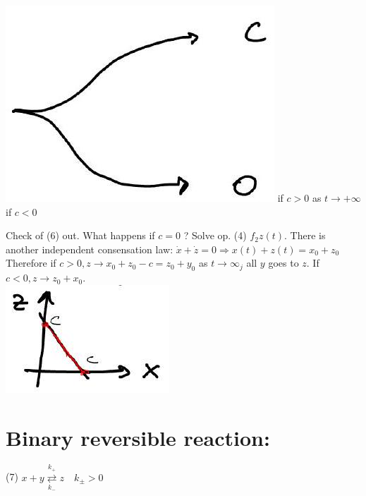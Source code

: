 \documentclass[10pt]{article}
\begin{document}
\includegraphics[max width=\textwidth]{2025_10_17_109d3ce1ba98c27731a1g-3(1)} if $c>0$ as $t \rightarrow+\infty$\\
if $c<0$

Check of (6) out. What happens if $c=0$ ? Solve op. (4) $f_{2} z(t)$. There is another independent consensation law: $\dot{x}+\dot{z}=0 \Rightarrow x(t)+z(t)=x_{0}+z_{0}$ Therefore if $c>0, z \longrightarrow x_{0}+z_{0}-c=z_{0}+y_{0}$ as $t \rightarrow \infty_{j}$ all $y$ goes to $z$. If $c<0, z \rightarrow z_{0}+x_{0}$.\\
\includegraphics[max width=\textwidth, center]{2025_10_17_109d3ce1ba98c27731a1g-3(2)}

\section*{Binary reversible reaction:}
(7) $x+y \underset{k_{-}}{\stackrel{k_{+}}{\rightleftarrows}} z \quad k_{ \pm}>0$
\end{document}
